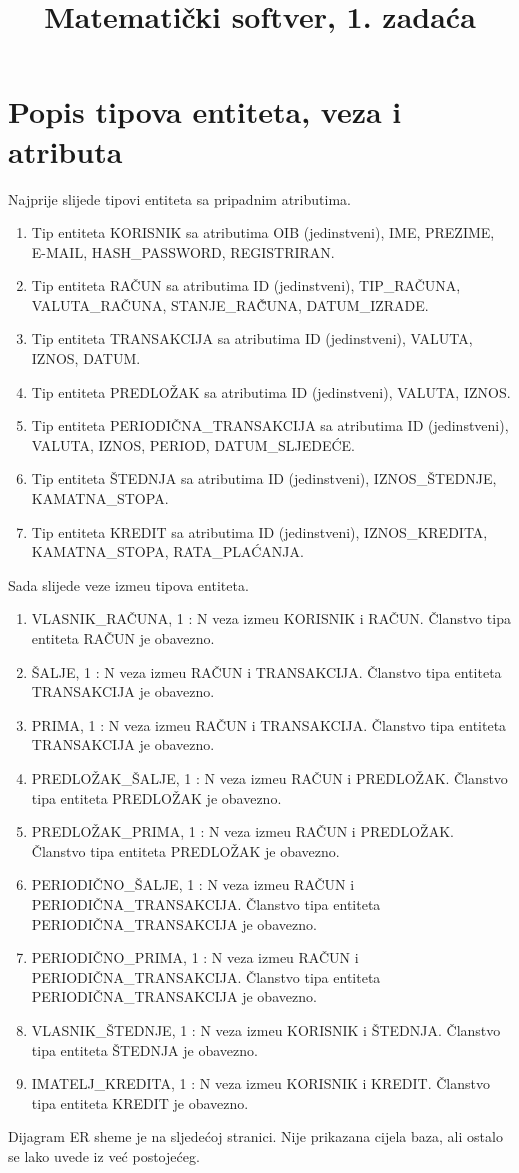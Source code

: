 \documentclass{article}
\title{Matemati\v{c}ki softver, 1. zada\'{c}a}
\begin{document}
\section{Popis tipova entiteta, veza i atributa}
Najprije slijede tipovi entiteta sa pripadnim atributima.
\begin{enumerate}
\item Tip entiteta KORISNIK sa atributima OIB (jedinstveni), IME, PREZIME, E-MAIL, HASH\_PASSWORD, REGISTRIRAN.
\item Tip entiteta RA\v{C}UN sa atributima ID (jedinstveni), TIP\_RA\v{C}UNA, VALUTA\_RA\v{C}UNA, STANJE\_RA\v{Č}UNA, DATUM\_IZRADE.
\item Tip entiteta TRANSAKCIJA sa atributima ID (jedinstveni), VALUTA, IZNOS, DATUM.
\item Tip entiteta PREDLO\v{Z}AK sa atributima ID (jedinstveni), VALUTA, IZNOS.
\item Tip entiteta PERIODI\v{C}NA\_TRANSAKCIJA sa atributima ID (jedinstveni), VALUTA, IZNOS, PERIOD, DATUM\_SLJEDE\'{C}E.
\item Tip entiteta \v{S}TEDNJA sa atributima ID (jedinstveni),  IZNOS\_\v{S}TEDNJE, KAMATNA\_STOPA.
\item Tip entiteta KREDIT sa atributima ID (jedinstveni), IZNOS\_KREDITA, KAMATNA\_STOPA, RATA\_PLA\'{C}ANJA.
\end{enumerate}
Sada slijede veze izme\dj u tipova entiteta.
\begin{enumerate}
\item VLASNIK\_RA\v{C}UNA, 1 : N veza izme\dj u KORISNIK i RA\v{C}UN. \v{C}lanstvo tipa entiteta RA\v{C}UN je obavezno.
\item \v{S}ALJE, 1 : N veza izme\dj u RA\v{C}UN i TRANSAKCIJA. \v{C}lanstvo tipa entiteta TRANSAKCIJA je obavezno.
\item PRIMA, 1 : N veza izme\dj u RA\v{C}UN i TRANSAKCIJA. \v{C}lanstvo tipa entiteta TRANSAKCIJA je obavezno.
\item PREDLO\v{Z}AK\_\v{S}ALJE, 1 : N veza izme\dj u RA\v{C}UN i PREDLO\v{Z}AK. \v{C}lanstvo tipa entiteta PREDLO\v{Z}AK je obavezno.
\item PREDLO\v{Z}AK\_PRIMA, 1 : N veza izme\dj u RA\v{C}UN i PREDLO\v{Z}AK. \v{C}lanstvo tipa entiteta PREDLO\v{Z}AK je obavezno.
\item PERIODI\v{C}NO\_\v{S}ALJE, 1 : N veza izme\dj u RA\v{C}UN i PERIODI\v{C}NA\_TRANSAKCIJA. \v{C}lanstvo tipa entiteta PERIODI\v{C}NA\_TRANSAKCIJA je obavezno.
\item PERIODI\v{C}NO\_PRIMA, 1 : N veza izme\dj u RA\v{C}UN i PERIODI\v{C}NA\_TRANSAKCIJA. \v{C}lanstvo tipa entiteta PERIODI\v{C}NA\_TRANSAKCIJA je obavezno.
\item VLASNIK\_\v{S}TEDNJE, 1 : N veza izme\dj u KORISNIK i \v{S}TEDNJA. \v{C}lanstvo tipa entiteta \v{S}TEDNJA je obavezno.
\item IMATELJ\_KREDITA, 1 : N veza izme\dj u KORISNIK i KREDIT. \v{C}lanstvo tipa entiteta KREDIT je obavezno.
\end{enumerate}
Dijagram ER sheme je na sljede\'{c}oj stranici. Nije prikazana cijela baza, ali ostalo se lako uvede iz ve\'{c} postoje\'{c}eg.
\end{document}
